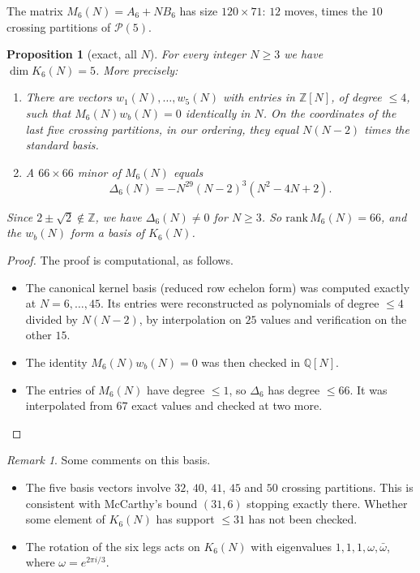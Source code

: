 \documentclass[11pt]{amsart}
\newtheorem{proposition}[theorem]{Proposition}
\theoremstyle{definition}
\theoremstyle{remark}
\newtheorem{remark}[theorem]{Remark}
\theoremstyle{plain}
\numberwithin{equation}{section}
\numberwithin{table}{section}
\newcommand{\Q}{\mathbb Q}
\newcommand{\Z}{\mathbb Z}
\newcommand{\Pp}{\mathcal{P}}
\begin{document}
The matrix $M_6(N)=A_6+NB_6$ has size $120\times71$: $12$ moves, times the $10$ crossing partitions of $\Pp(5)$.

\begin{proposition}[exact, all $N$]\label{prop:lin}
For every integer $N\ge3$ we have $\dim K_6(N)=5$. More precisely:
\begin{enumerate}
\item There are vectors $w_1(N),\dots,w_5(N)$ with entries in $\Z[N]$, of degree $\le4$, such that $M_6(N)w_b(N)=0$ identically in $N$. On the coordinates of the last five crossing partitions, in our ordering, they equal $N(N-2)$ times the standard basis.
\item A $66\times66$ minor of $M_6(N)$ equals
\[
\Delta_6(N)=-N^{29}(N-2)^3(N^2-4N+2).
\]
\end{enumerate}
Since $2\pm\sqrt2\notin\Z$, we have $\Delta_6(N)\ne0$ for $N\ge3$. So $\mathrm{rank}\,M_6(N)=66$, and the $w_b(N)$ form a basis of $K_6(N)$.
\end{proposition}

\begin{proof}
The proof is computational, as follows.
\begin{itemize}
\item The canonical kernel basis (reduced row echelon form) was computed exactly at $N=6,\dots,45$. Its entries were reconstructed as polynomials of degree $\le4$ divided by $N(N-2)$, by interpolation on $25$ values and verification on the other $15$.
\item The identity $M_6(N)w_b(N)=0$ was then checked in $\Q[N]$.
\item The entries of $M_6(N)$ have degree $\le1$, so $\Delta_6$ has degree $\le66$. It was interpolated from $67$ exact values and checked at two more. \qedhere
\end{itemize}
\end{proof}

\begin{remark}
Some comments on this basis.
\begin{itemize}
\item The five basis vectors involve $32$, $40$, $41$, $45$ and $50$ crossing partitions. This is consistent with McCarthy's bound $(31,6)$ stopping exactly there. Whether some element of $K_6(N)$ has support $\le31$ has not been checked.
\item The rotation of the six legs acts on $K_6(N)$ with eigenvalues $1,1,1,\omega,\bar\omega$, where $\omega=e^{2\pi i/3}$.
\end{itemize}
\end{remark}
\end{document}
